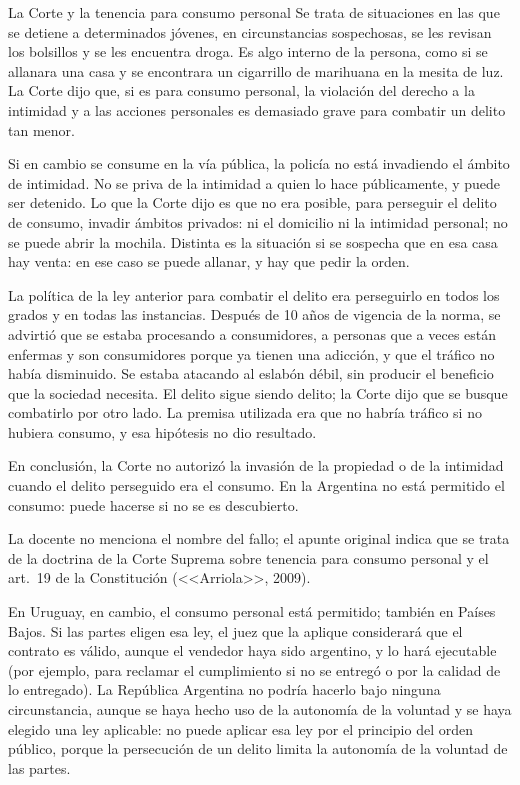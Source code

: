 \documentclass[12pt,oneside]{book}
\begin{document}
\begin{example}{La Corte y la tenencia para consumo personal}
Se trata de situaciones en las que se detiene a determinados j\'ovenes, en circunstancias sospechosas, se les revisan los bolsillos y se les encuentra droga. Es algo interno de la persona, como si se allanara una casa y se encontrara un cigarrillo de marihuana en la mesita de luz. La Corte dijo que, si es para consumo personal, la violaci\'on del derecho a la intimidad y a las acciones personales es demasiado grave para combatir un delito tan menor.

Si en cambio se consume en la v\'ia p\'ublica, la polic\'ia no est\'a invadiendo el \'ambito de intimidad. No se priva de la intimidad a quien lo hace p\'ublicamente, y puede ser detenido. Lo que la Corte dijo es que no era posible, para perseguir el delito de consumo, invadir \'ambitos privados: ni el domicilio ni la intimidad personal; no se puede abrir la mochila. Distinta es la situaci\'on si se sospecha que en esa casa hay venta: en ese caso se puede allanar, y hay que pedir la orden.

La pol\'itica de la ley anterior para combatir el delito era perseguirlo en todos los grados y en todas las instancias. Despu\'es de 10 a\~nos de vigencia de la norma, se advirti\'o que se estaba procesando a consumidores, a personas que a veces est\'an enfermas y son consumidores porque ya tienen una adicci\'on, y que el tr\'afico no hab\'ia disminuido. Se estaba atacando al eslab\'on d\'ebil, sin producir el beneficio que la sociedad necesita. El delito sigue siendo delito; la Corte dijo que se busque combatirlo por otro lado. La premisa utilizada era que no habr\'ia tr\'afico si no hubiera consumo, y esa hip\'otesis no dio resultado.

En conclusi\'on, la Corte no autoriz\'o la invasi\'on de la propiedad o de la intimidad cuando el delito perseguido era el consumo. En la Argentina no est\'a permitido el consumo: puede hacerse si no se es descubierto.
\end{example}

\begin{note}
La docente no menciona el nombre del fallo; el apunte original indica que se trata de la doctrina de la Corte Suprema sobre tenencia para consumo personal y el art.~19 de la Constituci\'on (<<Arriola>>, 2009).
\end{note}

En Uruguay, en cambio, el consumo personal est\'a permitido; tambi\'en en Pa\'ises Bajos. Si las partes eligen esa ley, el juez que la aplique considerar\'a que el contrato es v\'alido, aunque el vendedor haya sido argentino, y lo har\'a ejecutable (por ejemplo, para reclamar el cumplimiento si no se entreg\'o o por la calidad de lo entregado). La Rep\'ublica Argentina no podr\'ia hacerlo bajo ninguna circunstancia, aunque se haya hecho uso de la autonom\'ia de la voluntad y se haya elegido una ley aplicable: no puede aplicar esa ley por el principio del orden p\'ublico, porque la persecuci\'on de un delito limita la autonom\'ia de la voluntad de las partes.
\end{document}
